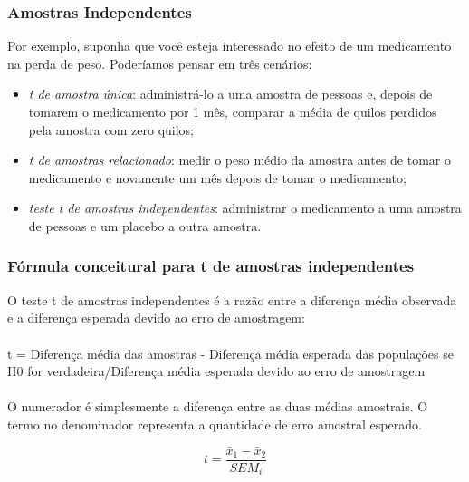 \documentclass[11pt]{beamer}
\begin{document}
\begin{frame}
\frametitle{Amostras Independentes}
Por exemplo, suponha que você esteja interessado no efeito de um medicamento na perda de peso. Poderíamos pensar em três cenários:
\begin{itemize}
\item \textit{t de amostra única}: administrá-lo a uma amostra de pessoas e, depois de tomarem o medicamento por 1 mês, comparar a média de quilos perdidos pela amostra com zero quilos;
\item \textit{t de amostras relacionado}: medir o peso médio da amostra antes de tomar o medicamento e novamente um mês depois de tomar o medicamento;
\item \textit{teste t de amostras independentes}: administrar o medicamento a uma amostra de pessoas e um placebo a outra amostra.
\end{itemize}
\end{frame}

\begin{frame}
\frametitle{Fórmula conceitural para t de amostras independentes}
O teste t de amostras independentes é a razão entre a diferença média observada e a diferença esperada devido ao erro de amostragem:\\~\\

t = Diferença média das amostras - Diferença média esperada das populações se H0 for verdadeira/Diferença média esperada devido ao erro de amostragem\\~\\

O numerador é simplesmente a diferença entre as duas médias amostrais. O termo no denominador representa a quantidade de erro amostral esperado.

\[t = \frac{\bar{x}_1-\bar{x}_2}{SEM_i}\]

\end{frame}
\end{document}
